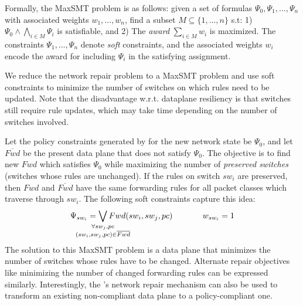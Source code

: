 Formally, the MaxSMT problem is as follows:
given a set of formulas $\Psi_0, \Psi_1, \ldots, \Psi_n$ with
associated weights $w_1, \ldots, w_n$, find a subset $M \subseteq \{1,
\ldots, n\}$ s.t:
1) $\Psi_0 \wedge \bigwedge_{i \in M} \Psi_i$ is satisfiable, and 
2) The \emph{award} $\sum_{i \in M} w_i$  is maximized. 
The constraints $\Psi_1, \ldots, \Psi_n$ denote \emph{soft} constraints, and
the associated weights $w_i$ encode the award for including $\Psi_i$ in the satisfying
assignment. 

We reduce the network repair problem to a MaxSMT problem
and use soft constraints to minimize the number of 
switches on which rules need to be updated. Note that
the disadvantage w.r.t. dataplane resiliency is that switches still
require rule updates, which may take time depending on the number of
switches involved.

 Let the policy constraints generated by \name for the new network
 state be $\Psi_0$, and let $\overline{Fwd}$ be the present data plane
 that does not satisfy $\Psi_0$. The objective is to find new $Fwd$
 which satisfies $\Psi_0$ while maximizing the number of \emph{preserved
   switches} (switches whose rules are unchanged). If the
 rules on switch $sw_i$ are preserved, then $Fwd$ and $\overline{Fwd}$
 have the same forwarding rules for all packet classes which traverse
 through $sw_i$. The following soft constraints capture this idea:
\begin{equation}
	\Psi_{sw_i} =  
	  \bigvee_{\mathclap{\substack{\forall sw_j, pc \\
			  		(sw_i, sw_j, pc) \in \overline{Fwd}}}} Fwd(sw_i, sw_j, pc) 
			~~~~~~~~~~~ 
			w_{sw_i}= 1
\end{equation}
The solution to this MaxSMT problem is a data plane that minimizes the number of
switches whose rules have to be changed.  Alternate repair objectives
like minimizing the number of changed forwarding rules can be
expressed similarly. Interestingly, the \name's network repair
mechanism can also be used to transform an existing
non-compliant data plane to a policy-compliant one.
